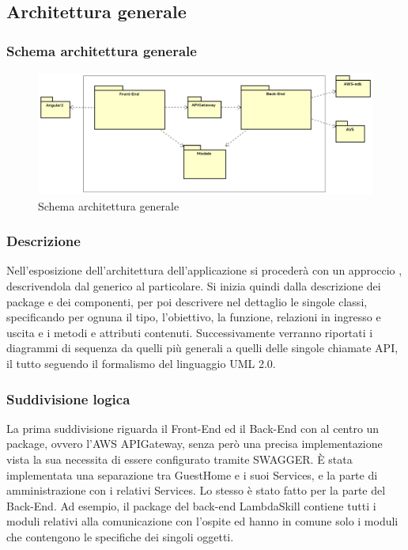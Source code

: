 \documentclass[../DefinizioneDiProdotto.tex]{subfiles}
\begin{document}
	\subsection{Architettura generale}
		\subsubsection{Schema architettura generale}
		\begin{figure}[!h]
			\centering
			\includegraphics[width=\textwidth]{Architettura/AltoLivello.png}
			\caption{Schema architettura generale}
		\end{figure}

		\subsubsection{Descrizione}
		Nell'esposizione dell'architettura dell'applicazione si procederà con un approccio , descrivendola dal generico al particolare. Si inizia quindi dalla descrizione dei package e dei componenti, per poi descrivere nel dettaglio le singole classi, specificando per ognuna il tipo, l'obiettivo, la funzione, relazioni in ingresso e uscita e i metodi e attributi contenuti. Successivamente verranno riportati i diagrammi di sequenza da quelli più generali a quelli delle singole chiamate API, il tutto seguendo il formalismo del linguaggio UML 2.0.

		\subsubsection{Suddivisione logica}
		La prima suddivisione riguarda il Front-End ed il Back-End con al centro un package, ovvero l'AWS APIGateway, senza però una precisa implementazione vista la sua necessita di essere configurato tramite SWAGGER. È stata implementata una separazione tra GuestHome e i suoi Services, e la parte di amministrazione con i relativi Services. Lo stesso è stato fatto per la parte del Back-End. Ad esempio, il package del back-end LambdaSkill contiene tutti i moduli relativi alla comunicazione con l'ospite ed hanno in comune solo i moduli che contengono le specifiche dei singoli oggetti.
\end{document}
